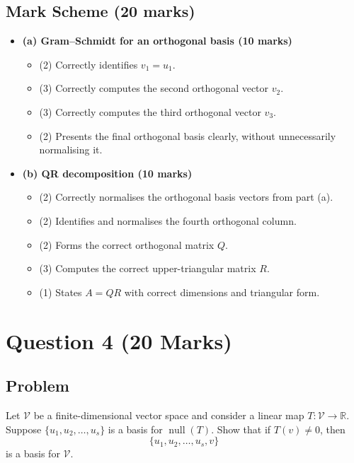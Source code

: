 \documentclass[12pt]{article}
\newcommand{\R}{\mathbb{R}}
\newcommand{\V}{\mathcal{V}}
\newcommand{\Null}{\operatorname{null}}
\begin{document}
\subsection{Mark Scheme (20 marks)}
\begin{itemize}[leftmargin=1.6em]
  \item \textbf{(a) Gram--Schmidt for an orthogonal basis (10 marks)}
  \begin{itemize}[leftmargin=1.6em]
    \item (2) Correctly identifies $v_1=u_1$.
    \item (3) Correctly computes the second orthogonal vector $v_2$.
    \item (3) Correctly computes the third orthogonal vector $v_3$.
    \item (2) Presents the final orthogonal basis clearly, without unnecessarily normalising it.
  \end{itemize}

  \item \textbf{(b) QR decomposition (10 marks)}
  \begin{itemize}[leftmargin=1.6em]
    \item (2) Correctly normalises the orthogonal basis vectors from part (a).
    \item (2) Identifies and normalises the fourth orthogonal column.
    \item (2) Forms the correct orthogonal matrix $Q$.
    \item (3) Computes the correct upper-triangular matrix $R$.
    \item (1) States $A=QR$ with correct dimensions and triangular form.
  \end{itemize}
\end{itemize}

\newpage
\section{Question 4 \hfill (20 Marks)}

\subsection{Problem}
Let $\V$ be a finite-dimensional vector space and consider a linear map $T:\V\to\R$. Suppose $\{u_1,u_2,\ldots,u_s\}$ is a basis for $\Null(T)$. Show that if $T(v)\neq0$, then
\[
\{u_1,u_2,\ldots,u_s,v\}
\]
is a basis for $\V$.
\end{document}
